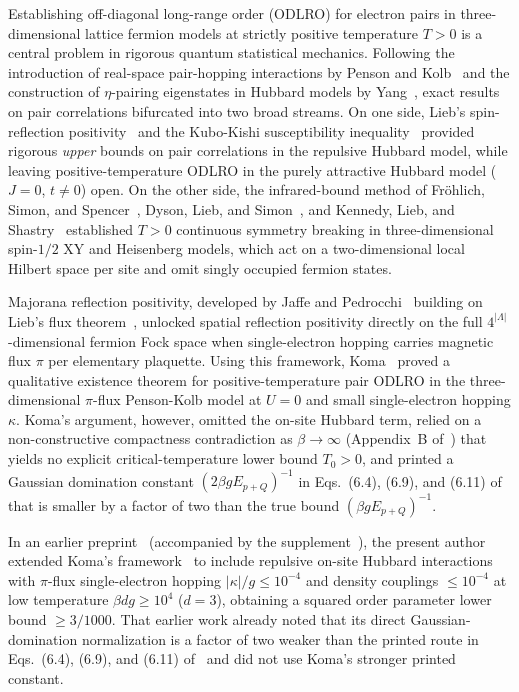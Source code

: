 \documentclass[11pt]{article}
\theoremstyle{definition}
\theoremstyle{remark}
\begin{document}
Establishing off-diagonal long-range order (ODLRO) for electron pairs in three-dimensional lattice fermion models at strictly positive temperature $T > 0$ is a central problem in rigorous quantum statistical mechanics. Following the introduction of real-space pair-hopping interactions by Penson and Kolb~\cite{penson1986} and the construction of $\eta$-pairing eigenstates in Hubbard models by Yang~\cite{yang1989}, exact results on pair correlations bifurcated into two broad streams. On one side, Lieb's spin-reflection positivity~\cite{lieb1989} and the Kubo-Kishi susceptibility inequality~\cite{kubo1990} provided rigorous \emph{upper} bounds on pair correlations in the repulsive Hubbard model, while leaving positive-temperature ODLRO in the purely attractive Hubbard model ($J=0$, $t \ne 0$) open. On the other side, the infrared-bound method of Fr\"ohlich, Simon, and Spencer~\cite{frohlich1976}, Dyson, Lieb, and Simon~\cite{dyson1978}, and Kennedy, Lieb, and Shastry~\cite{kennedy1988} established $T > 0$ continuous symmetry breaking in three-dimensional spin-$1/2$ XY and Heisenberg models, which act on a two-dimensional local Hilbert space per site and omit singly occupied fermion states.

Majorana reflection positivity, developed by Jaffe and Pedrocchi~\cite{jaffe2014,jaffe2015a,jaffe2015b} building on Lieb's flux theorem~\cite{lieb1994,macris1996}, unlocked spatial reflection positivity directly on the full $4^{|\Lambda|}$-dimensional fermion Fock space when single-electron hopping carries magnetic flux $\pi$ per elementary plaquette. Using this framework, Koma~\cite{koma2022} proved a qualitative existence theorem for positive-temperature pair ODLRO in the three-dimensional $\pi$-flux Penson-Kolb model at $U = 0$ and small single-electron hopping $\kappa$. Koma's argument, however, omitted the on-site Hubbard term, relied on a non-constructive compactness contradiction as $\beta \to \infty$ (Appendix~B of~\cite{koma2022}) that yields no explicit critical-temperature lower bound $T_0 > 0$, and printed a Gaussian domination constant $(2\beta g E_{p+Q})^{-1}$ in Eqs.~(6.4), (6.9), and (6.11) of~\cite{koma2022} that is smaller by a factor of two than the true bound $(\beta g E_{p+Q})^{-1}$.

In an earlier preprint~\cite{rens2026eta} (accompanied by the supplement~\cite{rens2026etasupp}), the present author extended Koma's framework~\cite{koma2022} to include repulsive on-site Hubbard interactions with $\pi$-flux single-electron hopping $|\kappa|/g \le 10^{-4}$ and density couplings $\le 10^{-4}$ at low temperature $\beta d g \ge 10^4$ ($d=3$), obtaining a squared order parameter lower bound $\ge 3/1000$. That earlier work already noted that its direct Gaussian-domination normalization is a factor of two weaker than the printed route in Eqs.~(6.4), (6.9), and (6.11) of~\cite{koma2022} and did not use Koma's stronger printed constant.
\end{document}
